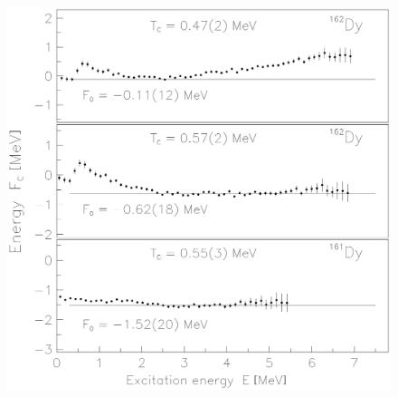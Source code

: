 \documentclass[sort&compress,final,numberedheadings]{aipproc}
\begin{document}
\begin{figure}
\includegraphics[totalheight=5cm,angle=0,bb=51 156 528 651,clip]{fig5a.ps}
\hspace*{1.5cm}

\end{figure}
\end{document}
